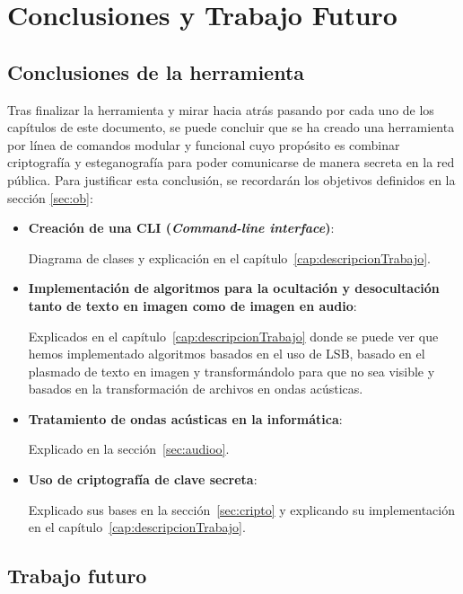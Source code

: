 \chapter{Conclusiones y Trabajo Futuro}
\label{cap:conclusiones}

\section{Conclusiones de la herramienta}
\label{susec:con}

Tras finalizar la herramienta y  mirar hacia atrás pasando por cada uno de los capítulos de este documento, se puede concluir que se ha creado una herramienta por línea
de comandos modular y funcional cuyo propósito es combinar criptografía y esteganografía para poder comunicarse de manera secreta en la red pública. Para justificar esta conclusión, se recordarán los objetivos definidos en la sección \ref{sec:ob}:

\begin{itemize}
    \item \textbf{Creación de una CLI (\textit{Command-line interface})}:
    
    Diagrama de clases y explicación en el capítulo~\ref{cap:descripcionTrabajo}.
    \item \textbf{Implementación de algoritmos para la ocultación y desocultación tanto de texto en imagen como de imagen en audio}:
    
    Explicados en el capítulo~\ref{cap:descripcionTrabajo} donde se puede ver que hemos implementado algoritmos basados en el uso de LSB, basado en el plasmado de texto en imagen y transformándolo para que no sea visible y basados en la transformación de archivos en ondas acústicas.
    \item \textbf{Tratamiento de ondas acústicas en la informática}: 
    
    Explicado en la sección~\ref{sec:audioo}.
    \item \textbf{Uso de criptografía de clave secreta}: 
    
    Explicado sus bases en la sección~\ref{sec:cripto} y explicando su implementación en el capítulo~\ref{cap:descripcionTrabajo}.
\end{itemize}


\section{ Trabajo futuro}
\label{subsec:tf}
 
